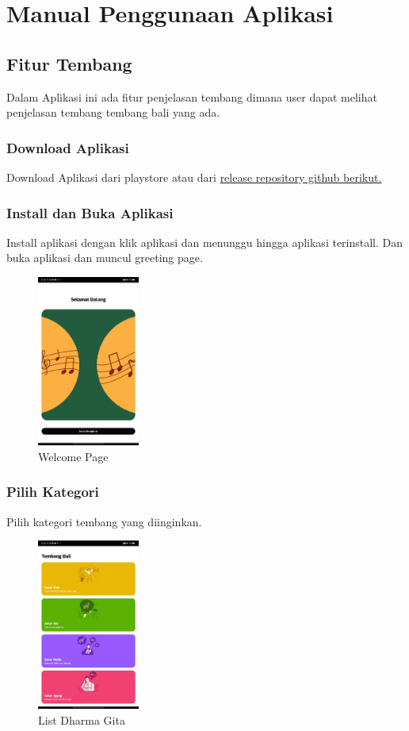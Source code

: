 \section{Manual Penggunaan Aplikasi}

\subsection{Fitur Tembang}
Dalam Aplikasi ini ada fitur penjelasan tembang dimana user dapat melihat penjelasan tembang tembang bali yang ada.
\subsubsection{Download Aplikasi}
Download Aplikasi dari playstore atau dari \href{https://github.com/rahdeva/tembang_bali}{release repository github berikut.} 

\subsubsection{Install dan Buka Aplikasi}
Install aplikasi dengan klik aplikasi dan menunggu hingga aplikasi terinstall. Dan buka aplikasi dan muncul greeting page.

\begin{figure}[H]
    \centering
    \includegraphics[width=0.3\textwidth]{assets/welcome.jpg}
    \caption{Welcome Page}
\end{figure}

\subsubsection{Pilih Kategori}
Pilih kategori tembang yang diinginkan.

\begin{figure}[H]
    \centering
    \includegraphics[width=0.3\textwidth]{assets/list-gita.jpg}
    \caption{List Dharma Gita}
\end{figure}

